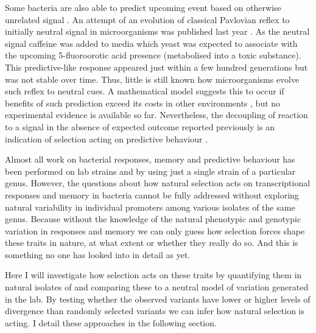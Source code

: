 Some bacteria are also able to predict upcoming event based on otherwise unrelated signal \cite{kondo1993circadian, min2005rhythmic, tagkopoulos2008predictive, mitchell2009adaptive}.
An attempt of an evolution of classical Pavlovian reflex to initially neutral signal in microorganisms was published last year \cite{lopez2017adaptive}.
As the neutral signal caffeine was added to media which yeast  was expected to associate with the upcoming 5-fluoroorotic acid presence (metabolised into a toxic substance).
This predictive-like response appeared just within a few hundred generations but was not stable over time.
Thus, little is still known how microorganisms evolve such reflex to neutral cues.
A mathematical model suggests this to occur if benefits of such prediction exceed its costs in other environments \cite{mitchell2011mathematical}, but no experimental evidence is available so far.
Nevertheless, the decoupling of reaction to a signal in the absence of expected outcome reported previously is an indication of selection acting on predictive behaviour \cite{tagkopoulos2008predictive, mitchell2009adaptive}.

Almost all work on bacterial responses, memory and predictive behaviour has been performed on lab strains and by using just a single strain of a particular genus.
However, the questions about how natural selection acts on transcriptional responses and memory in bacteria cannot be fully addressed without exploring natural variability in individual promoters among various isolates of the same genus.
Because without the knowledge of the natural phenotypic and genotypic variation in responses and memory we can only guess how selection forces shape these traits in nature, at what extent or whether they really do so.
And this is something no one has looked into in detail as yet.

Here I will investigate how selection acts on these traits by quantifying them in natural isolates of  and comparing these to a neutral model of variation generated in the lab.
By testing whether the observed variants have lower or higher levels of divergence than randomly selected variants we can infer how natural selection is acting.
I detail these approaches in the following section.

